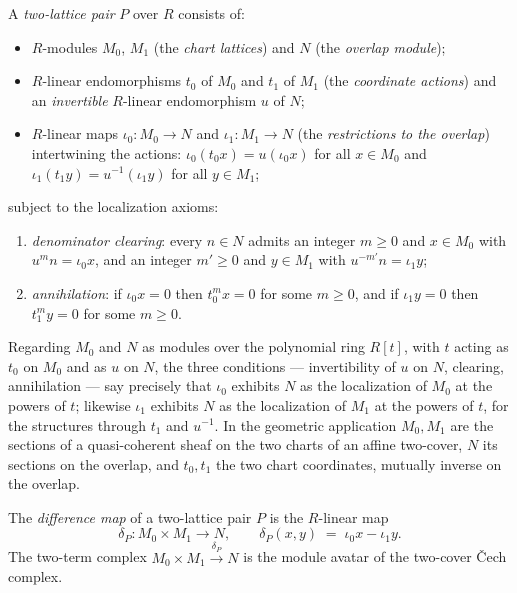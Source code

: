 \begin{definition}
  \label{pa-def:twoLatticePair}
  \leanok

  A \emph{two-lattice pair} \(P\) over \(R\) consists of:
  \begin{itemize}
    \item \(R\)-modules \(M_0\), \(M_1\) (the \emph{chart lattices}) and \(N\) (the
      \emph{overlap module});
    \item \(R\)-linear endomorphisms \(t_0\) of \(M_0\) and \(t_1\) of \(M_1\) (the
      \emph{coordinate actions}) and an \emph{invertible} \(R\)-linear endomorphism
      \(u\) of \(N\);
    \item \(R\)-linear maps \(\iota_0 : M_0 \to N\) and \(\iota_1 : M_1 \to N\) (the
      \emph{restrictions to the overlap}) intertwining the actions:
      \(\iota_0(t_0 x) = u(\iota_0 x)\) for all \(x \in M_0\) and
      \(\iota_1(t_1 y) = u^{-1}(\iota_1 y)\) for all \(y \in M_1\);
  \end{itemize}
  subject to the localization axioms:
  \begin{enumerate}
    \item \emph{denominator clearing}: every \(n \in N\) admits an integer \(m \ge 0\)
      and \(x \in M_0\) with \(u^m n = \iota_0 x\), and an integer \(m' \ge 0\) and
      \(y \in M_1\) with \(u^{-m'} n = \iota_1 y\);
    \item \emph{annihilation}: if \(\iota_0 x = 0\) then \(t_0^m x = 0\) for some
      \(m \ge 0\), and if \(\iota_1 y = 0\) then \(t_1^m y = 0\) for some \(m \ge 0\).
  \end{enumerate}
  Regarding \(M_0\) and \(N\) as modules over the polynomial ring \(R[t]\), with \(t\)
  acting as \(t_0\) on \(M_0\) and as \(u\) on \(N\), the three conditions ---
  invertibility of \(u\) on \(N\), clearing, annihilation --- say precisely that
  \(\iota_0\) exhibits \(N\) as the localization of \(M_0\) at the powers of \(t\);
  likewise \(\iota_1\) exhibits \(N\) as the localization of \(M_1\) at the powers of
  \(t\), for the structures through \(t_1\) and \(u^{-1}\). In the geometric application
  \(M_0, M_1\) are the sections of a quasi-coherent sheaf on the two charts of an affine
  two-cover, \(N\) its sections on the overlap, and \(t_0, t_1\) the two chart
  coordinates, mutually inverse on the overlap.
\end{definition}

\begin{definition}
  \label{pa-def:twoLattice_diff}
  \leanok

  The \emph{difference map} of a two-lattice pair \(P\) is the \(R\)-linear map
  \[
    \delta_P : M_0 \times M_1 \longrightarrow N, \qquad
    \delta_P(x, y) \;=\; \iota_0 x - \iota_1 y .
  \]
  The two-term complex \(M_0 \times M_1 \xrightarrow{\ \delta_P\ } N\) is the module
  avatar of the two-cover \v{C}ech complex.
\end{definition}


